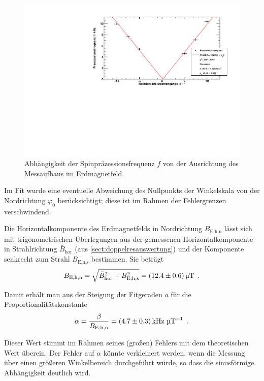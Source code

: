 \begin{figure}[H]
    \begin{center}
        \includegraphics[width=\textwidth]{../img/part4/winkel.pdf}
        \caption{Abhängigkeit der Spinpräzessionsfrequenz $f$ von der Ausrichtung des Messaufbaus im Erdmagnetfeld.}
        \label{img:spp:Winkelabhängigkeit}
    \end{center}
\end{figure}

Im Fit wurde eine eventuelle Abweichung des Nullpunkts der Winkelskala
von der Nordrichtung $\varphi_0$ berücksichtigt;
diese ist im Rahmen der Fehlergrenzen verschwindend.


Die Horizontalkomponente des Erdmagnetfelds in Nordrichtung $B_\text{E,h,n}$ lässt sich
mit trigonometrischen Überlegungen aus der gemessenen Horizontalkomponente in Strahlrichtung $\bar{B}_\text{hor}$
(aus \autoref{sect:doppelresauswertung}) und der Komponente senkrecht zum Strahl $B_\text{E,h,s}$ bestimmen.
Sie beträgt
\begin{equation}
    B_\text{E,h,n} = \sqrt{\bar{B}_\text{hor}^2+B_\text{E,h,s}^2}=(12.4 \pm 0.6)\,\text{\textmu T} \ \, .
\end{equation}

Damit erhält man aus der Steigung der Fitgeraden $a$ für die Proportionalitätskonstante
\begin{equation}
    \alpha = \frac{\beta}{B_\text{E,h,n}} = (4.7\pm0.3)\,\text{kHz } \text{\textmu T}^{-1} \ \, .
\end{equation}

Dieser Wert stimmt im Rahmen seines (großen) Fehlers mit dem theoretischen Wert überein.
Der Fehler auf $\alpha$ könnte verkleinert werden,
wenn die Messung über einen größeren Winkelbereich durchgeführt würde,
so dass die sinusförmige Abhängigkeit deutlich wird.
